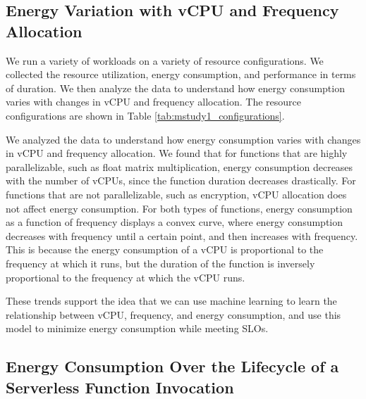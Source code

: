 \documentclass[times, 10pt,twocolumn]{article}
\begin{document}
\subsection{Energy Variation with vCPU and Frequency Allocation}

We run a variety of workloads on a variety of resource configurations. We collected the resource utilization, energy consumption, and performance in terms of duration. We then analyze the data to understand how energy consumption varies with changes in vCPU and frequency allocation. The resource configurations are shown in Table \ref{tab:mstudy1_configurations}.

We analyzed the data to understand how energy consumption varies with changes in vCPU and frequency allocation. We found that for functions that are highly parallelizable, such as float matrix multiplication, energy consumption decreases with the number of vCPUs, since the function duration decreases drastically. For functions that are not parallelizable, such as encryption, vCPU allocation does not affect energy consumption. For both types of functions, energy consumption as a function of frequency displays a convex curve, where energy consumption decreases with frequency until a certain point, and then increases with frequency. This is because the energy consumption of a vCPU is proportional to the frequency at which it runs, but the duration of the function is inversely proportional to the frequency at which the vCPU runs.

These trends support the idea that we can use machine learning to learn the relationship between vCPU, frequency, and energy consumption, and use this model to minimize energy consumption while meeting SLOs.

\subsection{Energy Consumption Over the Lifecycle of a Serverless Function Invocation}





\end{document}
